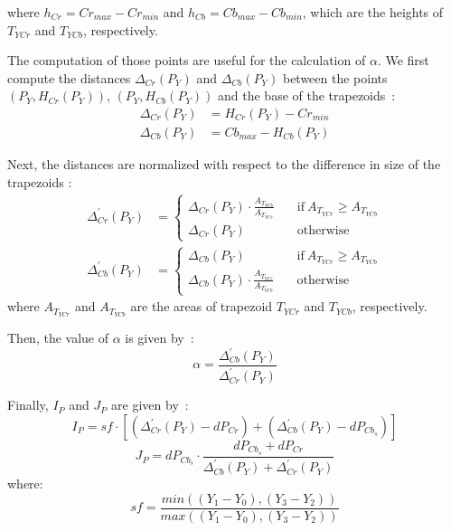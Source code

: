 \noindent where $h_{Cr} = Cr_{max} - Cr_{min}$ and $h_{Cb} = Cb_{max} - Cb_{min}$, which are the heights of $T_{YCr}$ and $T_{YCb}$, respectively.

The computation of those points are useful for the calculation of $\alpha$. We first compute the distances $\Delta_{Cr}(P_Y)$ and $\Delta_{Cb}(P_Y)$ between the points $(P_Y, H_{Cr}(P_Y))$, $(P_Y, H_{Cb}(P_Y))$ and the base of the trapezoids~\citep{brancati:17}:
\begin{align}
    \Delta_{Cr}(P_Y) &= H_{Cr}(P_Y) - Cr_{min} \\
    \Delta_{Cb}(P_Y) &= Cb_{max} - H_{Cb}(P_Y)
\end{align}

Next, the distances are normalized with respect to the difference in size of the trapezoids \citep{brancati:17}:
\begin{align}
  \Delta^{'}_{Cr}(P_Y) &=  \begin{cases}
                \Delta_{Cr}(P_Y) \cdot \frac{A_{T_{YCb}}} {A_{T_{YCr}}} &\quad \text{if}\ A_{T_{YCr}} \geq A_{T_{YCb}} \\
                \Delta_{Cr}(P_Y) &\quad \text{otherwise}
              \end{cases}
\\
  \Delta^{'}_{Cb}(P_Y) &=  \begin{cases}
                \Delta_{Cb}(P_Y) &\quad \text{if}\ A_{T_{YCr}} \geq A_{T_{YCb}} \\
                \Delta_{Cb}(P_Y) \cdot \frac{A_{T_{YCr}}} {A_{T_{YCb}}} &\quad \text{otherwise}
              \end{cases}
\end{align}
where $A_{T_{YCr}}$ and $A_{T_{YCb}}$ are the areas of trapezoid ${T_{YCr}}$ and ${T_{YCb}}$, respectively.

Then, the value of $\alpha$ is given by~\citep{brancati:17}:
\begin{equation}
    \alpha = \frac{\Delta^{'}_{Cb}(P_Y)} {\Delta^{'}_{Cr}(P_Y)}
\end{equation}

Finally, $I_P$ and $J_P$ are given by~\citep{brancati:17}:
\begin{equation}
    I_P = sf \cdot [(\Delta^{'}_{Cr}(P_Y) - dP_{Cr}) + (\Delta^{'}_{Cb}(P_Y) - dP_{Cb_s})]
    \label{eq:ip}
\end{equation}
\begin{equation}
    J_P = dP_{Cb_s} \cdot \frac{dP_{Cb_s} + dP_{Cr}} {\Delta^{'}_{Cb}(P_Y) + \Delta^{'}_{Cr}(P_Y)}
    \label{eq:jp}
\end{equation}
where:
\begin{equation}
    sf = \frac{min( (Y_1 - Y_0), (Y_3 - Y_2) )} {max( (Y_1 - Y_0), (Y_3 - Y_2) )}
\end{equation}


